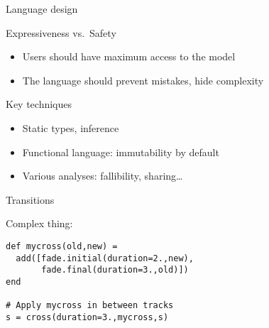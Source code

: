 \documentclass{beamer}
\begin{document}

\begin{frame}{Language design}

\begin{block}{Expressiveness vs.~Safety}
\begin{itemize}
\item<2-> Users should have maximum access to the model
\item<3-> The language should prevent mistakes, hide complexity
\end{itemize}
\end{block}

\begin{block}{Key techniques}
\begin{itemize}
\item<4-> Static types, inference
\item<5-> Functional language: immutability by default
\item<6-> Various analyses: fallibility, sharing\ldots
\end{itemize}
\end{block}

\end{frame}


\begin{frame}[fragile]{Transitions}

 \begin{center}
\end{center}

\vfill
\pause
Complex thing:
\begin{lstlisting}
def mycross(old,new) =
  add([fade.initial(duration=2.,new),
       fade.final(duration=3.,old)])
end

# Apply mycross in between tracks
s = cross(duration=3.,mycross,s)
\end{lstlisting}
\end{frame}
\end{document}
